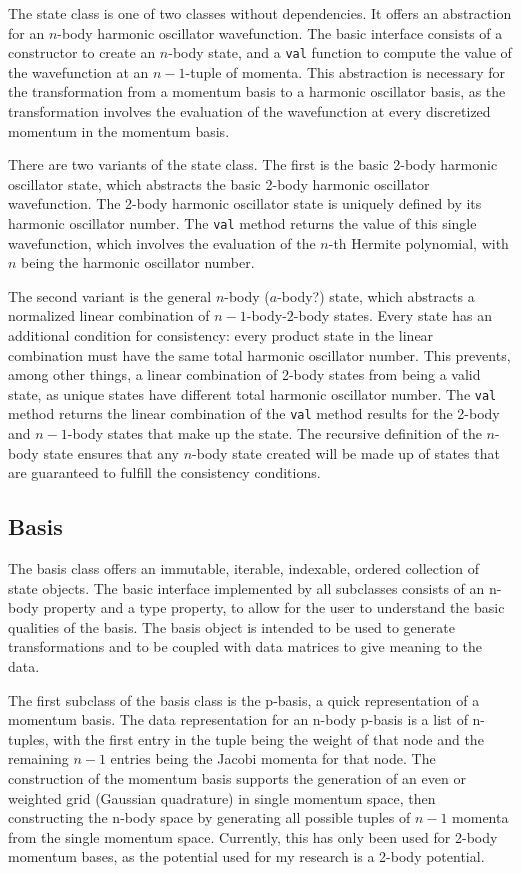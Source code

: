 The state class is one of two classes without dependencies. It offers an abstraction for an $n$-body harmonic oscillator wavefunction. The basic interface consists of a constructor to create an $n$-body state, and a \texttt{val} function to compute the value of the wavefunction at an $n-1$-tuple of momenta. This abstraction is necessary for the transformation from a momentum basis to a harmonic oscillator basis, as the transformation involves the evaluation of the wavefunction at every discretized momentum in the momentum basis.

There are two variants of the state class. The first is the basic 2-body harmonic oscillator state, which abstracts the basic 2-body harmonic oscillator wavefunction. The 2-body harmonic oscillator state is uniquely defined by its harmonic oscillator number. The \texttt{val} method returns the value of this single wavefunction, which involves the evaluation of the $n$-th Hermite polynomial, with $n$ being the harmonic oscillator number.

The second variant is the general $n$-body ($a$-body?) state, which abstracts a normalized linear combination of $n-1$-body-$2$-body states. Every state has an additional condition for consistency: every product state in the linear combination must have the same total harmonic oscillator number. This prevents, among other things, a linear combination of 2-body states from being a valid state, as unique states have different total harmonic oscillator number. The \texttt{val} method returns the linear combination of the \texttt{val} method results for the 2-body and $n-1$-body states that make up the state. The recursive definition of the $n$-body state ensures that any $n$-body state created will be made up of states that are guaranteed to fulfill the consistency conditions.

\subsection{Basis}

The basis class offers an immutable, iterable, indexable, ordered collection of state objects. The basic interface implemented by all subclasses consists of an n-body property and a type property, to allow for the user to understand the basic qualities of the basis. The basis object is intended to be used to generate transformations and to be coupled with data matrices to give meaning to the data.

The first subclass of the basis class is the p-basis, a quick representation of a momentum basis. The data representation for an n-body p-basis is a list of n-tuples, with the first entry in the tuple being the weight of that node and the remaining $n-1$ entries being the Jacobi momenta for that node. The construction of the momentum basis supports the generation of an even or weighted grid (Gaussian quadrature) in single momentum space, then constructing the n-body space by generating all possible tuples of $n-1$ momenta from the single momentum space. Currently, this has only been used for 2-body momentum bases, as the potential used for my research is a 2-body potential.

